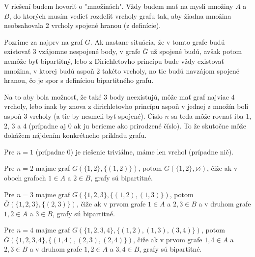 
V riešení budem hovoriť o "množinách". Vždy budem mať na mysli množiny 
$A$ a $B$, do ktorých musím vedieť rozdeliť vrcholy grafu tak, aby 
žiadna množina neobsahovala 2 vrcholy spojené hranou (z definície).

Pozrime za  najprv na graf $G$. Ak nastane situácia, že v tomto grafe 
budú existovať 3 vzájomne nespojené body, v grafe $\overline{G}$ už 
spojené budú, avšak potom nemôže byť bipartitný, lebo z Dirichletovho 
princípu bude vždy existovať množina, v ktorej budú aspoň 2 takéto 
vrcholy, no tie budú navzájom spojené hranou, čo je spor s definíciou 
bipartitného grafu.

Na to aby bola možnosť, že také 3 body neexistujú, môže mať graf 
najviac 4 vrcholy, lebo inak by znova z dirichletovho princípu aspoň 
v jednej z množín boli aspoň 3 vrcholy (a tie by nesmeli byť spojené). 
Číslo $n$ sa teda môže rovnať iba 1, 2, 3 a 4 (prípadne aj 0 ak ju 
berieme ako prirodzené číslo). To že skutočne môže dokážem nájdením 
konkrétneho príkladu grafu. 

Pre $n=1$ (prípadne 0) je riešenie triviálne, máme len vrchol (prípadne 
nič).

Pre $n=2$ majme graf $G(\{1,2\}, \{(1,2)\})$, potom 
$\overline{G}(\{1,2\}, \varnothing)$, čiže ak v oboch grafoch $1\in A$ 
a $2\in B$, grafy sú bipartitné.

Pre $n=3$ majme graf $G(\{1,2,3\}, \{(1,2), (1,3)\})$, potom 
$\overline{G}(\{1,2,3\}, \{(2,3)\})$, čiže ak v prvom grafe $1\in A$ 
a $2,3\in B$ a v druhom grafe $1,2\in A$ a $3\in B$, grafy sú 
bipartitné.

Pre $n=4$ majme graf $G(\{1,2,3,4\}, \{(1,2), (1,3), (3,4)\})$, potom 
$\overline{G}(\{1,2,3,4\}, \{(1,4), (2,3), (2,4)\})$, čiže ak v prvom 
grafe $1,4\in A$ a $2,3\in B$ a v druhom grafe $1,2\in A$ a $3,4\in B$, 
grafy sú bipartitné.

